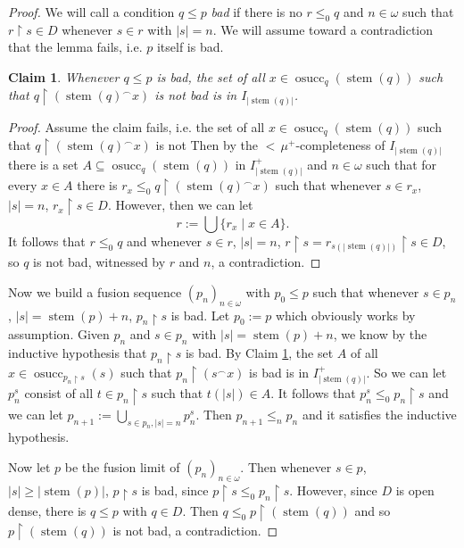 \documentclass[a4paper]{amsart}
\theoremstyle{definition}
\theoremstyle{remark}
\theoremstyle{plain}
\newtheorem{myclaim}{Claim}
\numberwithin{mydef}{section}
\DeclareMathOperator{\stem}{stem}
\DeclareMathOperator{\osucc}{osucc}
\newcommand{\uhr}{\upharpoonright}
\begin{document}
	\begin{proof}
		We will call a condition $q\leq p$ \emph{bad} if there is no $r\leq_0q$ and $n\in\omega$ such that $r\uhr s\in D$ whenever $s\in r$ with $|s|=n$. We will assume toward a contradiction that the lemma fails, i.e. $p$ itself is bad.
		
		\setcounter{myclaim}{0}
		
		\begin{myclaim}\label{StrongPrikryClaim1}
			Whenever $q\leq p$ is bad, the set of all $x\in\osucc_q(\stem(q))$ such that $q\uhr(\stem(q)^{\frown}x)$ is not bad is in $I_{|\stem(q)|}$.
		\end{myclaim}
		
		\begin{proof}
			Assume the claim fails, i.e. the set of all $x\in\osucc_q(\stem(q))$ such that $q\uhr(\stem(q)^{\frown}x)$ is not Then by the ${<}\,\mu^+$-completeness of $I_{|\stem(q)|}$ there is a set $A\subseteq\osucc_q(\stem(q))$ in $I_{|\stem(q)|}^+$ and $n\in\omega$ such that for every $x\in A$ there is $r_x\leq_0q\uhr(\stem(q)^{\frown}x)$ such that whenever $s\in r_x$, $|s|=n$, $r_x\uhr s\in D$. However, then we can let
			$$r:=\bigcup\{r_x\;|\;x\in A\}.$$
			It follows that $r\leq_0q$ and whenever $s\in r$, $|s|=n$, $r\uhr s=r_{s(|\stem(q)|)}\uhr s\in D$, so $q$ is not bad, witnessed by $r$ and $n$, a contradiction.
		\end{proof}
		
		Now we build a fusion sequence $(p_n)_{n\in\omega}$ with $p_0\leq p$ such that whenever $s\in p_n$, $|s|=\stem(p)+n$, $p_n\uhr s$ is bad. Let $p_0:=p$ which obviously works by assumption. Given $p_n$ and $s\in p_n$ with $|s|=\stem(p)+n$, we know by the inductive hypothesis that $p_n\uhr s$ is bad. By Claim \ref{StrongPrikryClaim1}, the set $A$ of all $x\in\osucc_{p_n\uhr s}(s)$ such that $p_n\uhr(s^{\frown}x)$ is bad is in $I_{|\stem(q)|}^+$. So we can let $p_n^s$ consist of all $t\in p_n\uhr s$ such that $t(|s|)\in A$. It follows that $p_n^s\leq_0p_n\uhr s$ and we can let $p_{n+1}:=\bigcup_{s\in p_n,|s|=n}p_n^s$. Then $p_{n+1}\leq_np_n$ and it satisfies the inductive hypothesis.
		
		Now let $p$ be the fusion limit of $(p_n)_{n\in\omega}$. Then whenever $s\in p$, $|s|\geq|\stem(p)|$, $p\uhr s$ is bad, since $p\uhr s\leq_0 p_n\uhr s$. However, since $D$ is open dense, there is $q\leq p$ with $q\in D$. Then $q\leq_0p\uhr(\stem(q))$ and so $p\uhr(\stem(q))$ is not bad, a contradiction.
	\end{proof}
	
\end{document}
